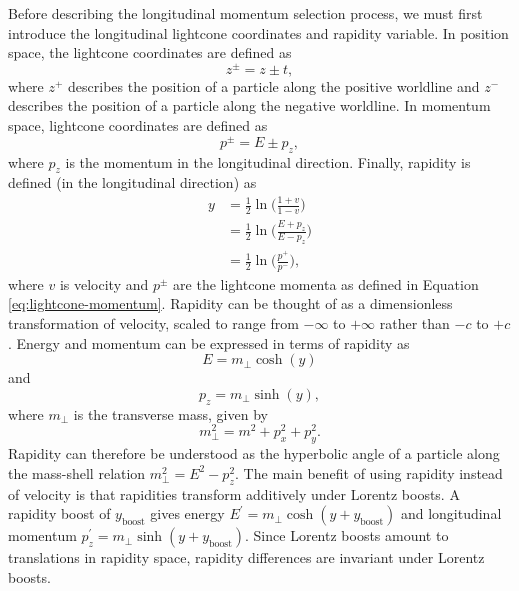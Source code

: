 \documentclass[12pt,a4paper]{report}
\begin{document}
Before describing the longitudinal momentum selection process, we must first introduce the longitudinal lightcone coordinates and rapidity variable. In position space, the lightcone coordinates are defined as
\begin{equation}
  z^\pm = z \pm t,
\end{equation}
where $z^+$ describes the position of a particle along the positive worldline and $z^-$ describes the position of a particle along the negative worldline. In momentum space, lightcone coordinates are defined as
\begin{equation}\label{eq:lightcone-momentum}
  p^\pm = E \pm p_z,
\end{equation}
where $p_z$ is the momentum in the longitudinal direction. Finally, rapidity is defined (in the longitudinal direction) as
\begin{align}
  y &= \frac{1}{2} \ln \Bigr( \frac{1+v}{1-v}\Bigr)  \nonumber \\
    &= \frac{1}{2} \ln \Bigr( \frac{E + p_z}{E - p_z} \Bigr) \nonumber \\
  &= \frac{1}{2} \ln \Bigr(\frac{p^+}{p^-}\Bigr), \label{eq:rapidity}
\end{align}
where $v$ is velocity and $p^\pm$ are the lightcone momenta as defined in Equation \eqref{eq:lightcone-momentum}. Rapidity can be thought of as a dimensionless transformation of velocity, scaled to range from $-\infty$ to $+\infty$ rather than $-c$ to $+c$. Energy and momentum can be expressed in terms of rapidity as
\begin{equation}
  E = m_\perp \cosh(y)
\end{equation}
and
\begin{equation}
  p_z = m_\perp \sinh(y),
\end{equation}
where $m_\perp$ is the transverse mass, given by
\begin{equation}
  m_\perp^2 = m^2 + p_x^2 + p_y^2.
\end{equation}
Rapidity can therefore be understood as the hyperbolic angle of a particle along the mass-shell relation $m_\perp^2 = E^2 - p_z^2$. The main benefit of using rapidity instead of velocity is that rapidities transform additively under Lorentz boosts. A rapidity boost of $y_\text{boost}$ gives energy $E^\prime = m_\perp \cosh(y + y_\text{boost})$ and longitudinal momentum $p_z^\prime = m_\perp \sinh(y + y_\text{boost})$. Since Lorentz boosts amount to translations in rapidity space, rapidity differences are invariant under Lorentz boosts.
\end{document}
